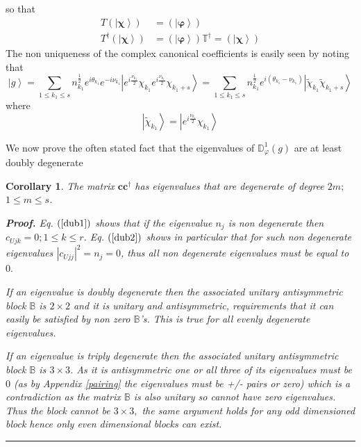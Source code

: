 \documentclass[aps,preprint]{revtex4}%
\newtheorem{corollary}[theorem]{Corollary}
\newenvironment{proof}[1][Proof]{\noindent\textbf{#1.} }{\ \rule{0.5em}{0.5em}}
\begin{document}
so that
\begin{align}
T\left(  \left\vert \mathbf{\chi}\right\rangle \right)   &  =\left(
\left\vert \mathbf{\varphi}\right\rangle \right) \nonumber\\
T^{\dagger}\left(  \left\vert \mathbf{\chi}\right\rangle \right)   &  =\left(
\left\vert \mathbf{\varphi}\right\rangle \right)  \mathbb{T}^{\dagger}=\left(
\left\vert \mathbf{\chi}\right\rangle \right)
\end{align}
The non uniqueness of the complex canonical coefficients is easily seen by
noting that
\begin{equation}
\left\vert g\right\rangle =\sum_{1\leq k_{1}\leq s}n_{k_{1}}^{\frac{1}{2}%
}e^{i\theta_{k_{1}}}e^{-i\nu_{k_{1}}}\left\vert e^{i\frac{\nu_{k_{1}}}{2}}%
\chi_{k_{1}}e^{i\frac{\nu_{k_{1}}}{2}}\chi_{k_{1}+s}\right\rangle =\sum_{1\leq
k_{1}\leq s}n_{k_{1}}^{\frac{1}{2}}e^{i\left(  \theta_{k_{1}}-\nu_{k_{1}%
}\right)  }\left\vert \tilde{\chi}_{k_{1}}\tilde{\chi}_{k_{1}+s}\right\rangle
\end{equation}
where
\begin{equation}
\left\vert \tilde{\chi}_{k_{1}}\right\rangle =\left\vert e^{i\frac{\nu_{k_{1}%
}}{2}}\chi_{k_{1}}\right\rangle
\end{equation}


We now prove the often stated fact that the eigenvalues of $\mathbb{D}%
_{\varphi}^{1}\left(  g\right)  $ are at least doubly degenerate

\begin{corollary}
The matrix $\mathbf{cc}^{\dagger}$ has eigenvalues that are degenerate of
degree $2m;$ $1\leq m\leq s$.

\begin{proof}
Eq. $\left(  \ref{dub1}\right)  $ shows that if the eigenvalue $n_{j}$ is non
degenerate then $c_{Ujk}=0;1\leq k\leq r$. Eq. $\left(  \ref{dub2}\right)  $
shows in particular that for such non degenerate eigenvalues $\left\vert
c_{Ujj}\right\vert ^{2}=n_{j}=0$, thus all non degenerate eigenvalues must be
equal to $0.$

If an eigenvalue is doubly degenerate then the associated unitary
antisymmetric block $\mathbb{B}$ is $2\times2$ and it is unitary and
antisymmetric, requirements that it can easily be satisfied by non zero
$\mathbb{B}$'s. This is true for all evenly degenerate eigenvalues.

If an eigenvalue is triply degenerate then the associated unitary
antisymmetric block $\mathbb{B}$ is $3\times3$. As it is antisymmetric one or
all three of its eigenvalues must be $0$ (as by Appendix \ref{pairing} the
eigenvalues must be +/- pairs or zero) which is a contradiction as the matrix
$\mathbb{B}$ is also unitary so cannot have zero eigenvalues. Thus the block
cannot be $3\times3,$ the same argument holds for any odd dimensioned block
hence only even dimensional blocks can exist.
\end{proof}
\end{corollary}
\end{document}
